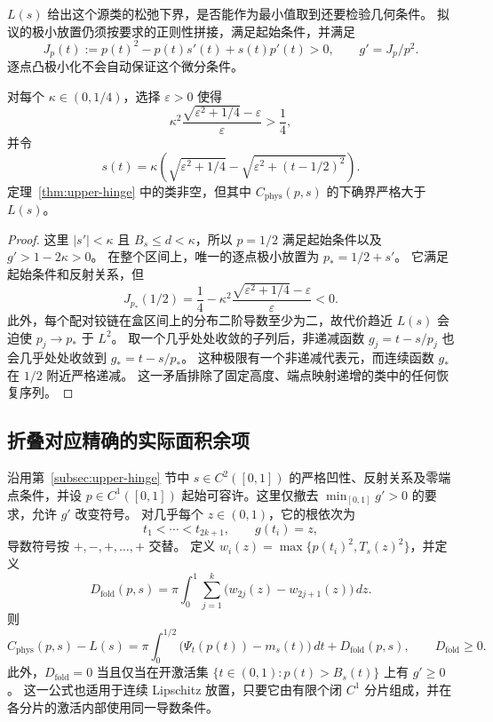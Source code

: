 $L(s)$ 给出这个源类的松弛下界，是否能作为最小值取到还要检验几何条件。
拟议的极小放置仍须按要求的正则性拼接，满足起始条件，并满足
\[
 J_p(t):=p(t)^2-p(t)s'(t)+s(t)p'(t)>0,
 \qquad g'=J_p/p^2.
\]
逐点凸极小化不会自动保证这个微分条件。

\begin{proposition}[松弛最小值不可达的非空类]
\label{prop:upper-unattainable}
对每个 $\kappa\in(0,1/4)$，选择 $\varepsilon>0$ 使得
\[
 \kappa^2\frac{\sqrt{\varepsilon^2+1/4}-\varepsilon}{\varepsilon}>\frac14,
\]
并令
\[
 s(t)=\kappa\left(\sqrt{\varepsilon^2+1/4}
                -\sqrt{\varepsilon^2+(t-1/2)^2}\right).
\]
定理~\ref{thm:upper-hinge} 中的类非空，但其中 $C_{\mathrm{phys}}(p,s)$ 的下确界严格大于 $L(s)$。
\end{proposition}

\begin{proof}
这里 $|s'|<\kappa$ 且 $B_s\le d<\kappa$，所以 $p=1/2$ 满足起始条件以及 $g'>1-2\kappa>0$。
在整个区间上，唯一的逐点极小放置为 $p_*=1/2+s'$。
它满足起始条件和反射关系，但
\[
 J_{p_*}(1/2)=\frac14-
 \kappa^2\frac{\sqrt{\varepsilon^2+1/4}-\varepsilon}{\varepsilon}<0.
\]
此外，每个配对铰链在盒区间上的分布二阶导数至少为二，故代价趋近 $L(s)$ 会迫使 $p_j\to p_*$ 于 $L^2$。
取一个几乎处处收敛的子列后，非递减函数 $g_j=t-s/p_j$ 也会几乎处处收敛到 $g_*=t-s/p_*$。
这种极限有一个非递减代表元，而连续函数 $g_*$ 在 $1/2$ 附近严格递减。
这一矛盾排除了固定高度、端点映射递增的类中的任何恢复序列。
\end{proof}

\subsection{折叠对应精确的实际面积余项}
\label{subsec:upper-fold}

\begin{theorem}[有序交叉余项]\label{thm:upper-fold}
沿用第~\ref{subsec:upper-hinge} 节中 $s\in C^2([0,1])$ 的严格凹性、反射关系及零端点条件，并设 $p\in C^1([0,1])$ 起始可容许。这里仅撤去 $\min_{[0,1]}g'>0$ 的要求，允许 $g'$ 改变符号。
对几乎每个 $z\in(0,1)$，它的根依次为
\[
 t_1<\cdots<t_{2k+1},\qquad g(t_i)=z,
\]
导数符号按 $+,-,+,\ldots,+$ 交替。
定义 $w_i(z)=\max\{p(t_i)^2,T_s(z)^2\}$，并定义
\begin{equation}\label{eq:upper-fold-def}
 D_{\mathrm{fold}}(p,s)=\pi\int_0^1
               \sum_{j=1}^{k}\bigl(w_{2j}(z)-w_{2j+1}(z)\bigr)\,dz.
\end{equation}
则
\begin{equation}\label{eq:upper-fold-identity}
 C_{\mathrm{phys}}(p,s)-L(s)=
 \pi\int_0^{1/2}\bigl(\Psi_t(p(t))-m_s(t)\bigr)\,dt
                 +D_{\mathrm{fold}}(p,s),\qquad D_{\mathrm{fold}}\ge0.
\end{equation}
此外，$D_{\mathrm{fold}}=0$ 当且仅当在开激活集 $\{t\in(0,1):p(t)>B_s(t)\}$ 上有 $g'\ge0$。
这一公式也适用于连续 Lipschitz 放置，只要它由有限个闭 $C^1$ 分片组成，并在各分片的激活内部使用同一导数条件。
\end{theorem}

